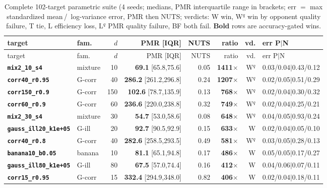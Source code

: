 {\small\setlength{\tabcolsep}{5pt}
\begin{longtable}{llrrrrrl}
\caption{Complete 102-target parametric suite (4 seeds; medians, PMR
interquartile range in brackets; err $=$ max standardized mean\,/\,
log-variance error, PMR then NUTS; verdicts: W win, W$^q$ win by opponent
quality failure, T tie, L efficiency loss, L$^q$ PMR quality failure, BF
both fail. \textbf{Bold} rows are accuracy-gated wins.}\label{tab:mega}\\
\toprule
target & fam. & $d$ & PMR [IQR] & NUTS & ratio & vd. & err P$\mid$N\\
\midrule\endfirsthead
\toprule
target & fam. & $d$ & PMR [IQR] & NUTS & ratio & vd. & err P$\mid$N\\
\midrule\endhead
\textbf{\texttt{mix2\_10\_s4}} & mixture & 10 & \textbf{69.1} [65.8,75.6] & 0.05 & \textbf{1411$\times$} & W$^q$ & 0.03/0.04$\mid$0.43/0.12\\
\textbf{\texttt{corr40\_r0.95}} & G-corr & 40 & \textbf{286.2} [261.2,296.8] & 0.24 & \textbf{1207$\times$} & W$^q$ & 0.02/0.05$\mid$0.51/0.29\\
\textbf{\texttt{corr150\_r0.9}} & G-corr & 150 & \textbf{102.6} [78.7,135.9] & 0.13 & \textbf{768$\times$} & W$^q$ & 0.02/0.04$\mid$0.30/0.32\\
\textbf{\texttt{corr60\_r0.9}} & G-corr & 60 & \textbf{236.6} [220.0,238.8] & 0.32 & \textbf{749$\times$} & W$^q$ & 0.02/0.04$\mid$0.25/0.21\\
\textbf{\texttt{mix2\_30\_s4}} & mixture & 30 & \textbf{54.7} [53.0,58.6] & 0.08 & \textbf{648$\times$} & W$^q$ & 0.04/0.05$\mid$0.93/0.24\\
\textbf{\texttt{gauss\_ill20\_k1e+05}} & G-ill & 20 & \textbf{92.7} [90.5,92.9] & 0.15 & \textbf{633$\times$} & W & 0.02/0.04$\mid$0.05/0.10\\
\textbf{\texttt{corr40\_r0.8}} & G-corr & 40 & \textbf{282.6} [258.5,293.5] & 0.49 & \textbf{581$\times$} & W$^q$ & 0.03/0.05$\mid$0.28/0.13\\
\textbf{\texttt{banana10\_b0.05}} & banana & 10 & \textbf{81.1} [65.1,94.8] & 0.17 & \textbf{486$\times$} & W & 0.05/0.05$\mid$0.17/0.27\\
\textbf{\texttt{gauss\_ill80\_k1e+05}} & G-ill & 80 & \textbf{67.5} [57.0,74.4] & 0.16 & \textbf{412$\times$} & W & 0.04/0.06$\mid$0.07/0.11\\
\textbf{\texttt{corr15\_r0.95}} & G-corr & 15 & \textbf{332.4} [294.9,348.0] & 0.82 & \textbf{406$\times$} & W & 0.02/0.04$\mid$0.18/0.11\\

\end{longtable}}
